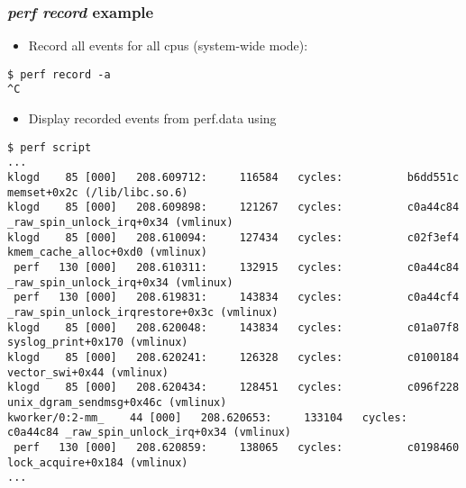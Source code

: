 \begin{frame}[fragile]
  \frametitle{{\em perf record} example}

  \begin{itemize}
    \item Record all events for all cpus (system-wide mode):
  \end{itemize}
  \begin{block}{}
    \begin{verbatim}
$ perf record -a
^C
    \end{verbatim}
  \end{block}
  \begin{itemize}
    \item Display recorded events from perf.data using 
  \end{itemize}
  \begin{block}{}
    \begin{verbatim}
$ perf script
...
klogd    85 [000]   208.609712:     116584   cycles:          b6dd551c memset+0x2c (/lib/libc.so.6)
klogd    85 [000]   208.609898:     121267   cycles:          c0a44c84 _raw_spin_unlock_irq+0x34 (vmlinux)
klogd    85 [000]   208.610094:     127434   cycles:          c02f3ef4 kmem_cache_alloc+0xd0 (vmlinux)
 perf   130 [000]   208.610311:     132915   cycles:          c0a44c84 _raw_spin_unlock_irq+0x34 (vmlinux)
 perf   130 [000]   208.619831:     143834   cycles:          c0a44cf4 _raw_spin_unlock_irqrestore+0x3c (vmlinux)
klogd    85 [000]   208.620048:     143834   cycles:          c01a07f8 syslog_print+0x170 (vmlinux)
klogd    85 [000]   208.620241:     126328   cycles:          c0100184 vector_swi+0x44 (vmlinux)
klogd    85 [000]   208.620434:     128451   cycles:          c096f228 unix_dgram_sendmsg+0x46c (vmlinux)
kworker/0:2-mm_    44 [000]   208.620653:     133104   cycles:          c0a44c84 _raw_spin_unlock_irq+0x34 (vmlinux)
 perf   130 [000]   208.620859:     138065   cycles:          c0198460 lock_acquire+0x184 (vmlinux)
...
    \end{verbatim}
  \end{block}
\end{frame}

